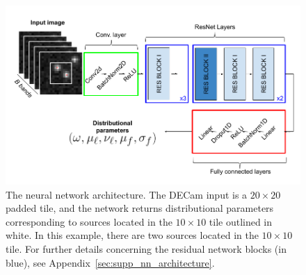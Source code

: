 
\begin{figure}[!tb]
    \centering
    \includegraphics[width=\textwidth]{figures/vi_figures/starnet_architecture8.png}
    \vspace{-1.cm}
    \caption{The neural network architecture. The DECam input is a $20\times 20$ padded tile, and the network returns distributional parameters corresponding to sources located in the $10\times 10$ tile outlined in white.
    In this example, there are two sources located in the $10\times10$ tile.
    For further details concerning the residual network blocks (in blue), see 
    Appendix~\ref{sec:supp_nn_architecture}.
    }
    \label{fig:starnet_arch}
\end{figure}



